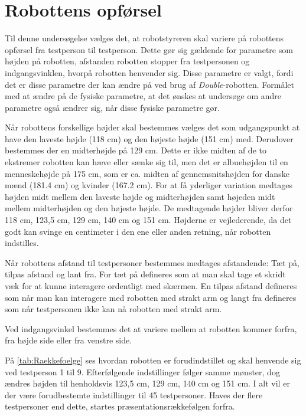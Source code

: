 \section{Robottens opførsel}
\label{RobottensOpfoersel}
Til denne undersøgelse vælges det, at robotstyreren skal variere på robottens opførsel fra testperson til testperson. Dette gør sig gældende for parametre som højden på robotten, afstanden robotten stopper fra testpersonen og indgangsvinklen, hvorpå robotten henvender sig. Disse parametre er valgt, fordi det er disse parametre der kan ændre på ved brug af \textit{Double}-robotten. Formålet med at ændre på de fysiske parametre, at det ønskes at undersøge om andre parametre også ændrer sig, når disse fysiske parametre gør. 

Når robottens forskellige højder skal bestemmes vælges det som udgangspunkt at have den laveste højde (118 cm) og den højeste højde (151 cm) med. Derudover bestemmes der en midterhøjde på 129 cm. Dette er ikke midten af de to ekstremer robotten kan hæve eller sænke sig til, men det er albuehøjden til en menneskehøjde på 175 cm, som er ca. midten af gennemsnitshøjden for danske mænd (181.4 cm) og kvinder (167.2 cm). For at få yderliger variation medtages højden midt mellem den laveste højde og midterhøjden samt højeden midt mellem midterhøjden og den højeste højde. De medtagende højder bliver derfor 118 cm, 123,5 cm, 129 cm, 140 cm og 151 cm. Højderne er vejlederende, da det godt kan svinge en centimeter i den ene eller anden retning, når robotten indstilles. 

Når robottens afstand til testpersoner bestemmes medtages afstandende: Tæt på, tilpas afstand og lant fra. For tæt på defineres som at man skal tage et skridt væk for at kunne interagere ordentligt med skærmen. En tilpas afstand defineres som når man kan interagere med robotten med strakt arm og langt fra defineres som når testpersonen ikke kan nå robotten med strakt arm.

Ved indgangsvinkel bestemmes det at variere mellem at robotten kommer forfra, fra højde side eller fra venstre side. 

På \autoref{tab:Raekkefoelge} ses hvordan robotten er forudindstillet og skal henvende sig ved testperson 1 til 9. Efterfølgende indstillinger følger samme mønster, dog ændres højden til henholdsvis 123,5 cm, 129 cm, 140 cm og 151 cm. I alt vil er der være forudbestemte indstillinger til 45 testpersoner. Haves der flere testpersoner end dette, startes præsentationsrækkefølgen forfra.


